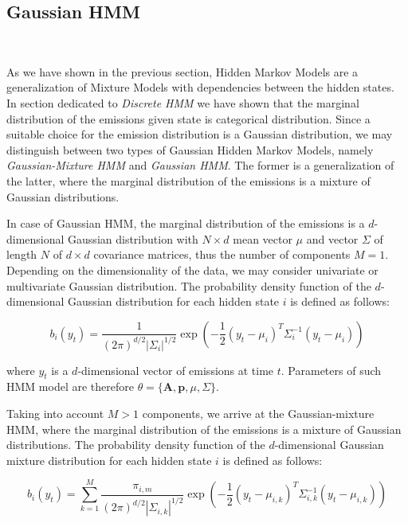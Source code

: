 \subsection{Gaussian HMM}~\label{sec:ghmm}

As we have shown in the previous section, Hidden Markov Models are a generalization of Mixture Models with dependencies between the hidden states.
In section dedicated to \textit{Discrete HMM} we have shown that the marginal distribution of the emissions given state is categorical distribution. 
Since a suitable choice for the emission distribution is a Gaussian distribution, we may distinguish between two types of Gaussian Hidden Markov Models,
namely \textit{Gaussian-Mixture HMM} and \textit{Gaussian HMM}. The former is a generalization of the latter, where the marginal distribution of the emissions is a mixture of Gaussian distributions. \citep{Bishop2006}

In case of Gaussian HMM, the marginal distribution of the emissions is a $d$-dimensional Gaussian distribution with $N \times d$ mean vector $\mu$ and vector $\Sigma$ of length $N$ of $d \times d$ covariance matrices, thus the number of components $M=1$. 
Depending on the dimensionality of the data, we may consider univariate or multivariate Gaussian distribution. The probability density function of the $d$-dimensional Gaussian distribution 
for each hidden state $i$ is defined as follows:

\begin{equation}
    b_i(y_t) = \frac{1}{{(2\pi)}^{d/2}|\Sigma_i|^{1/2}} \exp\left(-\frac{1}{2}{(y_t-\mu_i)}^T\Sigma^{-1}_i(y_t-\mu_i)\right)
\end{equation}

where $y_t$ is a $d$-dimensional vector of emissions at time $t$. Parameters of such HMM model are therefore $\theta = \{\textbf{A},\textbf{p},\mu,\Sigma\}$.

Taking into account $M>1$ components, we arrive at the Gaussian-mixture HMM, where the marginal distribution of the emissions is a mixture of Gaussian distributions. 
The probability density function of the $d$-dimensional Gaussian mixture distribution for each hidden state $i$ is defined as follows:

\begin{equation}
    b_i(y_t) = \sum_{k=1}^{M} \frac{\pi_{i,m}}{{(2\pi)}^{d/2}|\Sigma_{i,k}|^{1/2}} \exp\left(-\frac{1}{2}{(y_t-\mu_{i,k})}^T\Sigma^{-1}_{i,k}(y_t-\mu_{i,k})\right)
\end{equation}

